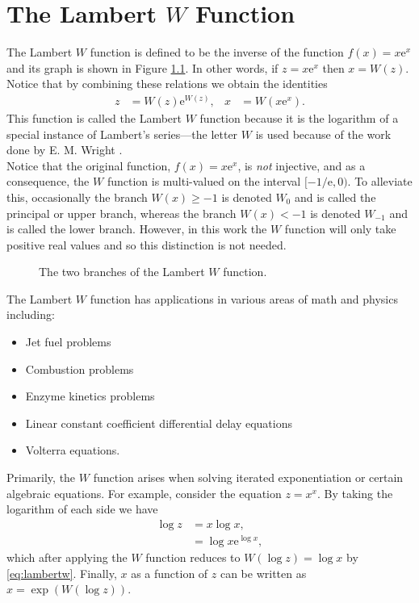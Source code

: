 
\chapter{The Lambert $W$ Function}
\label{chap:lambertw}
The Lambert $W$ function is defined to be the inverse of the function $f(x) = x \textrm{e}^x$ and its graph is shown in Figure \ref{fig:lambertw}. In other words, if $z = x \textrm{e}^x$ then $x = W(z)$. Notice that by combining these relations we obtain the identities
\begin{align}
\label{eq:lambertw}
z &= W(z) \textrm{e}^{W(z)}, & x &= W(x \textrm{e}^x).
\end{align}
This function is called the Lambert $W$ function because it is the logarithm of a special instance of Lambert's series---the letter $W$ is used because of the work done by E. M. Wright \cite{corless}. \\

Notice that the original function, $f(x) = x \textrm{e}^x$, is \emph{not} injective, and as a consequence, the $W$ function is multi-valued on the interval $[-1/\textrm{e},0)$. To alleviate this, occasionally the branch $W(x) \geq -1$ is denoted $W_0$ and is called the principal or upper branch, whereas the branch $W(x) < -1$ is denoted $W_{-1}$ and is called the lower branch. However, in this work the $W$ function will only take positive real values and so this distinction is not needed. \\

\begin{figure}[htbp]
\centering

\caption{The two branches of the Lambert $W$ function.}
\label{fig:lambertw}
\end{figure}

The Lambert $W$ function has applications in various areas of math and physics \cite{corless} including:
\begin{itemize}
\item Jet fuel problems
\item Combustion problems
\item Enzyme kinetics problems
\item Linear constant coefficient differential delay equations
\item Volterra equations.
\end{itemize}
Primarily, the $W$ function arises when solving iterated exponentiation or certain algebraic equations. For example, consider the equation $z = x^x$. By taking the logarithm of each side we have
\begin{align*}
\log z &= x \log x, \\
&= \log x \textrm{e}^{\log x},
\end{align*}
which after applying the $W$ function reduces to $W(\log z) = \log x$ by \eqref{eq:lambertw}. Finally, $x$ as a function of $z$ can be written as $x = \exp(W(\log z))$.

